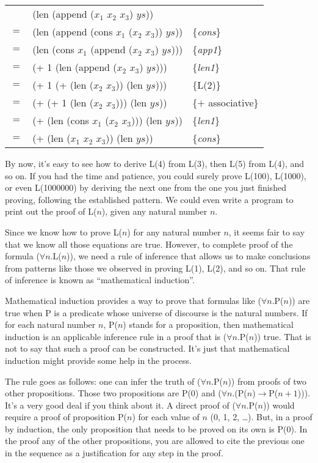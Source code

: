 \begin{center}
\begin{tabular}{lll}
    & (len (append ($x_1$ $x_2$ $x_3$) $ys$))         &                     \\
$=$ & (len (append (cons $x_1$ ($x_2$ $x_3$)) $ys$))  & \{\emph{cons}\}     \\
$=$ & (len (cons $x_1$ (append ($x_2$ $x_3$) $ys$)))  & \{\emph{app1}\}     \\
$=$ & (+ 1 (len (append ($x_2$ $x_3$) $ys$)))         & \{\emph{len1}\}     \\
$=$ & (+ 1 (+ (len ($x_2$ $x_3$)) (len $ys$)))        & \{L(2)\}            \\
$=$ & (+ (+ 1 (len ($x_2$ $x_3$))) (len $ys$))        & \{$+$ associative\} \\
$=$ & (+ (len (cons $x_1$ ($x_2$ $x_3$))) (len $ys$)) & \{\emph{len1}\}     \\
$=$ & (+ (len ($x_1$ $x_2$ $x_3$)) (len $ys$))        & \{\emph{cons}\}     \\
\end{tabular}
\end{center}

By now, it's easy to see how to derive L(4) from L(3), then L(5) from L(4), and so on. If you had the time and patience, you could surely prove L(100), L(1000), or even L(1000000) by deriving the next one from the one you just finished proving, following the established pattern. We could even write a program to print out the proof of L($n$), given any natural number $n$.

Since we know how to prove L($n$) for any natural number $n$, it seems fair to say that we know all those equations are true. However, to complete proof of the formula ($\forall$$n$.L($n$)), we need a rule of inference that allows us to make conclusions from patterns like those we observed in proving L(1), L(2), and so on. That rule of inference is known as ``mathematical induction''.

Mathematical induction provides a way to prove that formulas like ($\forall$$n$.P($n$)) are true when P is a predicate whose universe of discourse is the natural numbers. If for each natural number $n$, P($n$) stands for a proposition, then mathematical induction is an applicable inference rule in a proof that is ($\forall$$n$.P($n$)) true. That is not to say that such a proof can be constructed. It's just that mathematical induction might provide some help in the process.

The rule goes as follows: one can infer the truth of ($\forall$$n$.P($n$)) from proofs of two other propositions. Those two propositions are P(0) and ($\forall$$n$.(P($n$)$\rightarrow$P($n+1$))). It's a very good deal if you think about it. A direct proof of ($\forall$$n$.P($n$)) would require a proof of proposition P($n$) for each value of $n$ (0, 1, 2, \dots). But, in a proof by induction, the only proposition that needs to be proved on its own is P(0). In the proof any of the other propositions, you are allowed to cite the previous one in the sequence as a justification for any step in the proof.

